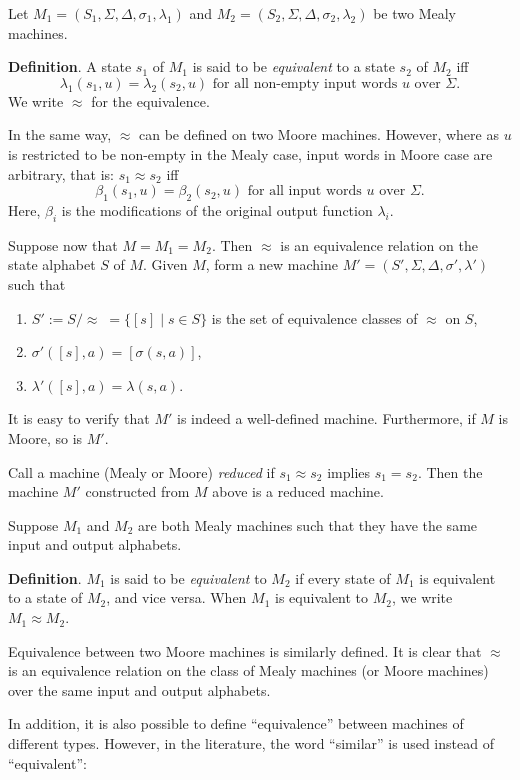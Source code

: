 \documentclass[12pt]{article}
\begin{document}
Let $M_1=(S_1,\Sigma,\Delta,\sigma_1,\lambda_1)$ and $M_2=(S_2,\Sigma,\Delta,\sigma_2,\lambda_2)$ be two Mealy machines.  

\textbf{Definition}.  A state $s_1$ of $M_1$ is said to be \emph{equivalent} to a state $s_2$ of $M_2$ iff
$$\lambda_1(s_1,u)=\lambda_2(s_2,u) \mbox{  for all non-empty input words }u\mbox{ over }\Sigma.$$
We write $\approx$ for the equivalence.

In the same way, $\approx$ can be defined on two Moore machines.  However, where as $u$ is restricted to be non-empty in the Mealy case, input words in Moore case are arbitrary, that is: $s_1 \approx s_2$ iff 
$$\beta_1(s_1,u)=\beta_2(s_2,u) \mbox{  for all input words }u\mbox{ over }\Sigma.$$
Here, $\beta_i$ is the modifications of the original output function $\lambda_i$.

Suppose now that $M=M_1=M_2$.  Then $\approx$ is an equivalence relation on the state alphabet $S$ of $M$.  Given $M$, form a new machine $M'=(S',\Sigma,\Delta,\sigma',\lambda')$ such that
\begin{enumerate}
\item $S':=S/\!\! \approx \; = \lbrace [s]\mid s\in S \rbrace$ is the set of equivalence classes of $\approx$ on $S$, 
\item $\sigma'([s],a)=[\sigma(s,a)]$,
\item $\lambda'([s],a)=\lambda(s,a)$.
\end{enumerate}
It is easy to verify that $M'$ is indeed a well-defined machine.  Furthermore, if $M$ is Moore, so is $M'$.

Call a machine (Mealy or Moore) \emph{reduced} if $s_1\approx s_2$ implies $s_1=s_2$.  Then the machine $M'$ constructed from $M$ above is a reduced machine.

Suppose $M_1$ and $M_2$ are both Mealy machines such that they have the same input and output alphabets.

\textbf{Definition}.  $M_1$ is said to be \emph{equivalent} to $M_2$ if every state of $M_1$ is equivalent to a state of $M_2$, and vice versa.  When $M_1$ is equivalent to $M_2$, we write $M_1\approx M_2$.

Equivalence between two Moore machines is similarly defined.  It is clear that $\approx$ is an equivalence relation on the class of Mealy machines (or Moore machines) over the same input and output alphabets.

In addition, it is also possible to define ``equivalence'' between machines of different types.  However, in the literature, the word ``similar'' is used instead of ``equivalent'':
\end{document}
